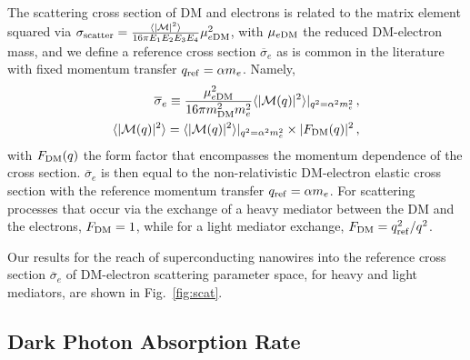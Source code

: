 \documentclass[twocolumn,10pt,prl,nofootinbib,preprintnumbers]{revtex4-1}
\newcommand{\beq}{\begin{eqnarray}}%
\newcommand{\eeq}{\end{eqnarray}}
\begin{document}
The scattering cross section of DM and electrons is related to the matrix element squared via $\sigma_{\rm scatter} =  \frac{\langle|\mathcal{M}|^2\rangle }{16\pi E_1 E_2 E_3 E_4}\mu_{e {\rm DM}}^2$, with $\mu_{e {\rm DM}}$ the reduced DM-electron mass, and we define a reference cross section $\overline \sigma_e$ as is common in the literature with fixed momentum transfer $q_{\rm ref} = \alpha  m_e$. Namely, 
%
\beq
\overline\sigma_e \equiv \frac{\mu_{e {\rm DM}}^2}{16\pi m_{\rm DM}^2 m_e^2}\langle|\mathcal{M}(q)|^2\rangle |_{q^2=\alpha^2 m_e^2}\,,\\
\langle|\mathcal{M}(q)|^2\rangle = \langle|\mathcal{M}(q)|^2\rangle |_{q^2=\alpha^2 m_e^2} \times |F_{\rm DM}(q)|^2\,,
\eeq
%
with $F_{\rm DM}(q)$ the form factor that encompasses the momentum
dependence of the cross section. $\overline \sigma_e$ is then equal to
the non-relativistic DM-electron elastic cross section with the
reference momentum transfer $q_{\rm ref}=\alpha m_e$. For scattering
processes that occur via the exchange of a heavy mediator between the
DM and the electrons, $F_{\rm DM}=1$, while for a light mediator
exchange, $F_{\rm DM}=q_{\rm ref}^2/q^2$.

Our results for the reach of superconducting nanowires into the
reference cross section $\overline \sigma_e$ of DM-electron scattering parameter space, for
heavy and light mediators, are shown in Fig.~\ref{fig:scat}.

\subsection{Dark Photon Absorption Rate}\label{app:rateabs}
%
\end{document}
